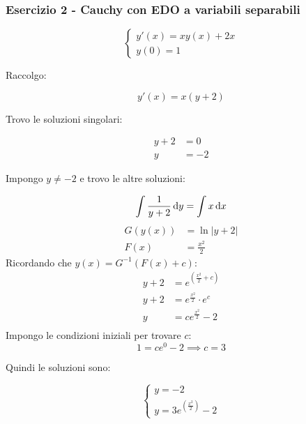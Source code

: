\pagebreak
\subsubsection*{Esercizio 2 {-} Cauchy con EDO a variabili separabili}

\begin{equation*}
    \begin{cases}
        y'(x) = xy(x)+2x \\
        y(0) = 1
    \end{cases}
\end{equation*}

Raccolgo:

\[
    y'(x)=x(y+2)
\]

Trovo le soluzioni singolari:

\begin{align*}
    y+2 & =0  \\
    y   & =-2
\end{align*}

Impongo \(y \ne -2\) e trovo le altre soluzioni:

\[
    \int \frac{1}{y+2} \mathop{}\!\mathrm{d} y = \int x \mathop{}\!\mathrm{d} x
\]
\begin{align*}
    G(y(x)) & = \ln |y+2|     \\
    F(x)    & = \frac{x^2}{2}
\end{align*}
Ricordando che \(y(x) = G^{-1}(F(x) + c)\):
\begin{align*}
    y + 2 & = e^{\left( \frac{x^2}{2} + c \right)} \\
    y + 2 & = e^{\frac{x^{2}}{2}} \cdot e^c        \\
    y     & = ce^{\frac{x^{2}}{2}} - 2             \\
\end{align*}
Impongo le condizioni iniziali per trovare \(c\):
\[
    1 = c e^0 - 2 \implies c = 3
\]

Quindi le soluzioni sono:

\begin{equation*}
    \begin{cases}
        y = -2 \\
        y = 3e^{\left( \frac{x^{2}}{2} \right)} - 2
    \end{cases}
\end{equation*}
